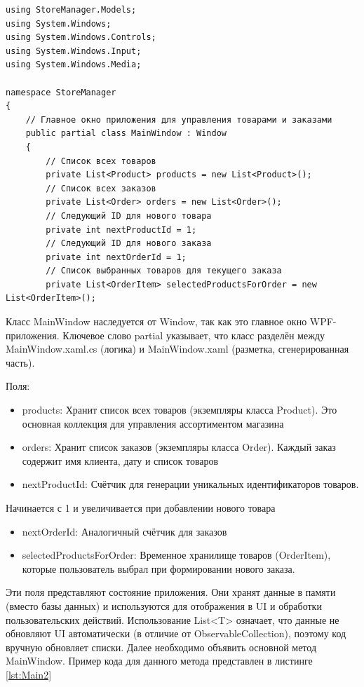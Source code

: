 \documentclass[12pt]{article}
\newcommand{\colorGIT}[1]{\textcolor{CtpGreen}{#1}}
\begin{document}
\begin{lstlisting}[style=csharp_catppuccin, caption=Пример кода для класса \colorGIT{\href{https://github.com/WebMasterIT/Csharp_Labs/blob/ec375afd16c0647b337cf3d8a79c8bef904fc1be/3lab/StoreManager/MainWindow.xaml.cs\#L1-L21}{Main}}, label=lst:Main]
using StoreManager.Models;
using System.Windows;
using System.Windows.Controls;
using System.Windows.Input;
using System.Windows.Media;

namespace StoreManager
{
    // Главное окно приложения для управления товарами и заказами
    public partial class MainWindow : Window
    {
        // Список всех товаров
        private List<Product> products = new List<Product>();
        // Список всех заказов
        private List<Order> orders = new List<Order>();
        // Следующий ID для нового товара
        private int nextProductId = 1;
        // Следующий ID для нового заказа
        private int nextOrderId = 1;
        // Список выбранных товаров для текущего заказа
        private List<OrderItem> selectedProductsForOrder = new List<OrderItem>();
\end{lstlisting}

Класс MainWindow наследуется от Window, так как это главное окно WPF-приложения. Ключевое слово partial указывает, что класс разделён между MainWindow.xaml.cs (логика) и MainWindow\-.xaml (разметка, сгенерированная часть).

Поля:
\begin{itemize}
	\item products: Хранит список всех товаров (экземпляры класса Product). Это основная коллекция для управления ассортиментом магазина
	\item orders: Хранит список заказов (экземпляры класса Order). Каждый заказ содержит имя клиента, дату и список товаров
	\item nextProductId: Счётчик для генерации уникальных идентификаторов товаров.
\end{itemize}

\pagebreak

Начинается с 1 и увеличивается при добавлении нового товара
\begin{itemize}
	\item nextOrderId: Аналогичный счётчик для заказов
	\item selectedProductsForOrder: Временное хранилище товаров (OrderItem), которые пользователь выбрал при формировании нового заказа.
\end{itemize}

Эти поля представляют состояние приложения. Они хранят данные в памяти (вместо базы данных) и используются для отображения в UI и обработки пользовательских действий. Использование List<T> означает, что данные не обновляют UI автоматически (в отличие от ObservableCollection), поэтому код вручную обновляет списки. Далее необходимо объявить основной метод MainWindow.
Пример кода для данного метода представлен в листинге \ref{lst:Main2}
\end{document}
